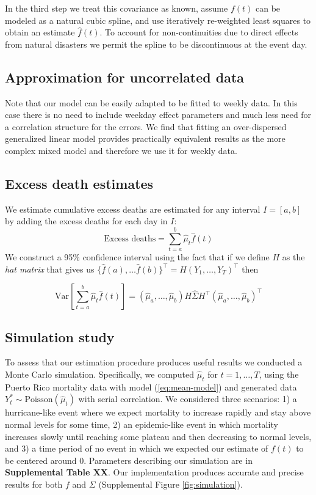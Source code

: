 \documentclass[11pt]{article}
\begin{document}
In the third step we treat this covariance as known, assume $f(t)$ can be modeled as a natural cubic spline, and use iteratively re-weighted least squares to obtain an estimate $\hat{f}(t)$. To account for non-continuities due to direct effects from natural disasters we permit the spline to be discontinuous at the event day. 

\subsection{Approximation for uncorrelated data}
Note that our model can be easily adapted to be fitted to weekly data. In this case there is no need to include weekday effect parameters and much less need for a correlation structure for the errors. We find that fitting an over-dispersed generalized linear model provides practically equivalent results as the more complex mixed model and therefore we use it for weekly data.

\subsection{Excess death estimates}
\label{subsec:excess-deaths}
We estimate cumulative excess deaths are estimated for any interval $I = [a, b]$ 
by adding the excess deaths for each day
in $I$: 
\begin{equation*}
    \mbox{Excess deaths} = \sum_{t = a}^b \hat{\mu}_t \hat{f}(t) 
\end{equation*}
We construct a 95\% confidence interval using the fact that if we define $H$ as the \emph{hat matrix} that gives us 
$\{ \hat{f}(a), \dots \hat{f}(b) \}^\top = H (Y_1, \dots, Y_T)^\top$ then

 \begin{equation*}
    \mbox{Var}\left[\sum_{t = a}^b \hat{\mu}_t \hat{f}(t) \right] = (\hat{\mu}_a,\dots,\hat{\mu}_b) H \hat{\Sigma} H^\top (\hat{\mu}_a,\dots,\hat{\mu}_b)^\top
 \end{equation*}
 
\subsection{Simulation study}
To assess that our estimation procedure produces useful results we conducted a Monte Carlo simulation. Specifically, we computed $\hat{\mu}_t$ for $t=1,\ldots, T$, using the Puerto Rico mortality data with model (\ref{eq:mean-model}) and generated data $Y_t^* \sim \mbox{Poisson}(\hat{\mu}_t)$ with serial correlation. We considered three scenarios: 1) a hurricane-like event where we expect mortality to increase rapidly and stay above normal levels for some time, 2) an epidemic-like event in which mortality increases slowly until reaching some plateau and then decreasing to normal levels, and 3) a time period of no event in which we expected our estimate of $f(t)$ to be centered around 0. Parameters describing our simulation are in \textbf{Supplemental Table XX}. Our implementation produces accurate and precise results for both $f$ and $\Sigma$ (Supplemental Figure \ref{fig:simulation}).
\end{document}
